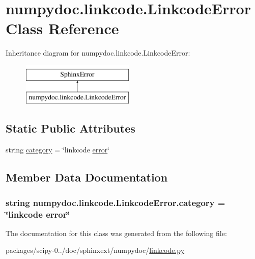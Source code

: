 \hypertarget{classnumpydoc_1_1linkcode_1_1LinkcodeError}{}\section{numpydoc.\+linkcode.\+Linkcode\+Error Class Reference}
\label{classnumpydoc_1_1linkcode_1_1LinkcodeError}
Inheritance diagram for numpydoc.\+linkcode.\+Linkcode\+Error\+:\begin{figure}[H]
\begin{center}
\leavevmode
\includegraphics[height=2.000000cm]{classnumpydoc_1_1linkcode_1_1LinkcodeError}
\end{center}
\end{figure}
\subsection*{Static Public Attributes}
\begin{DoxyCompactItemize}
\item 
string \hyperlink{classnumpydoc_1_1linkcode_1_1LinkcodeError_a9e72b487e579bc59044bd0639c0b49e9}{category} = \char`\"{}linkcode \hyperlink{specfun_8f_a1606d291e8b683668654c8d4219efa20}{error}\char`\"{}
\end{DoxyCompactItemize}


\subsection{Member Data Documentation}
\hypertarget{classnumpydoc_1_1linkcode_1_1LinkcodeError_a9e72b487e579bc59044bd0639c0b49e9}{}
\subsubsection[{category}]{\setlength{\rightskip}{0pt plus 5cm}string numpydoc.\+linkcode.\+Linkcode\+Error.\+category = \char`\"{}linkcode {\bf error}\char`\"{}\hspace{0.3cm}{\ttfamily [static]}}\label{classnumpydoc_1_1linkcode_1_1LinkcodeError_a9e72b487e579bc59044bd0639c0b49e9}


The documentation for this class was generated from the following file\+:\begin{DoxyCompactItemize}
\item 
packages/scipy-\/0../doc/sphinxext/numpydoc/\hyperlink{linkcode_8py}{linkcode.\+py}\end{DoxyCompactItemize}
